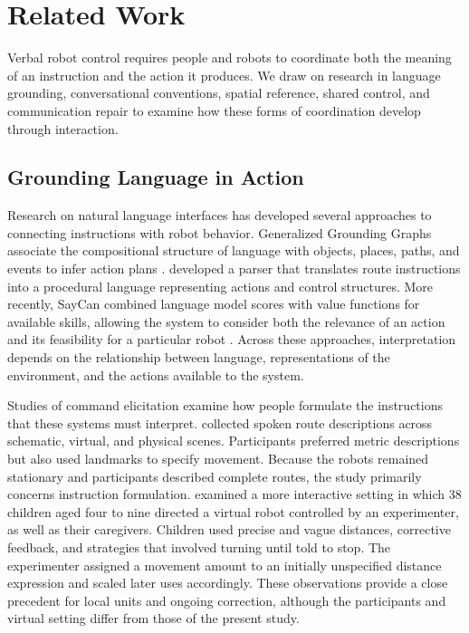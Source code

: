 
\section{Related Work}
\label{sec:related-work}


Verbal robot control requires people and robots to coordinate both the meaning of an instruction and the action it produces. We draw on research in language grounding, conversational conventions, spatial reference, shared control, and communication repair to examine how these forms of coordination develop through interaction.

\subsection{Grounding Language in Action}

Research on natural language interfaces has developed several approaches to connecting instructions with robot behavior. Generalized Grounding Graphs associate the compositional structure of language with objects, places, paths, and events to infer action plans \citep{tellex2011commands}. \citet{matuszek2013parse} developed a parser that translates route instructions into a procedural language representing actions and control structures. More recently, SayCan combined language model scores with value functions for available skills, allowing the system to consider both the relevance of an action and its feasibility for a particular robot \citep{ichter2023saycan}. Across these approaches, interpretation depends on the relationship between language, representations of the environment, and the actions available to the system.

Studies of command elicitation examine how people formulate the instructions that these systems must interpret. \citet{marge2010routes} collected spoken route descriptions across schematic, virtual, and physical scenes. Participants preferred metric descriptions but also used landmarks to specify movement. Because the robots remained stationary and participants described complete routes, the study primarily concerns instruction formulation. \citet{kocher2020left} examined a more interactive setting in which 38 children aged four to nine directed a virtual robot controlled by an experimenter, as well as their caregivers. Children used precise and vague distances, corrective feedback, and strategies that involved turning until told to stop. The experimenter assigned a movement amount to an initially unspecified distance expression and scaled later uses accordingly. These observations provide a close precedent for local units and ongoing correction, although the participants and virtual setting differ from those of the present study.

